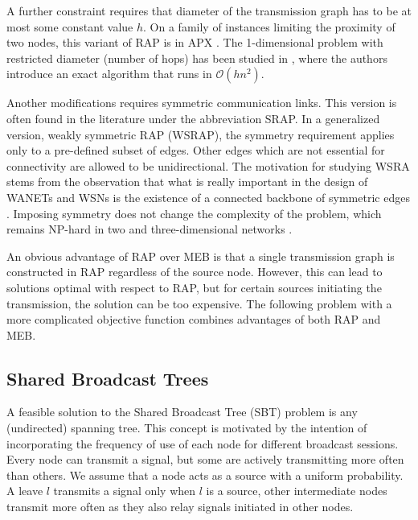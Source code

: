 A further constraint requires that diameter of the transmission graph has to be at most some constant value $h$.
On a family of instances limiting the proximity of two nodes, this variant of RAP is in APX \cite{clementi01b}.
The 1-dimensional problem with restricted diameter (number of hops) has been studied in \cite{clementi03}, where the authors introduce an exact algorithm that runs in $\mathcal{O}(hn^2)$.

Another modifications requires symmetric communication links.
This version is often found in the literature under the abbreviation SRAP.
In a generalized version, weakly symmetric RAP (WSRAP), the symmetry requirement applies only to a pre-defined subset of edges.
Other edges which are not essential for connectivity are allowed to be unidirectional.
The motivation for studying WSRA stems from the observation that what is really important in the design of WANETs and WSNs is the existence of a connected backbone of symmetric edges \cite{santi05}.
Imposing symmetry does not change the complexity of the problem, which remains NP-hard in two and three-dimensional networks \cite{blough02}.

An obvious advantage of RAP over MEB is that a single transmission graph is constructed in RAP regardless of the source node.
However, this can lead to solutions optimal with respect to RAP, but for certain sources initiating the transmission, the solution can be too expensive.
The following problem with a more complicated objective function combines advantages of both RAP and MEB.

\subsection{Shared Broadcast Trees}

A feasible solution to the Shared Broadcast Tree (SBT) problem is any (undirected) spanning tree.
This concept is motivated by the intention of incorporating the frequency of use of each node for different broadcast sessions.
Every node can transmit a signal, but some are actively transmitting more often than others.
We assume that a node acts as a source with a uniform probability. 
A leave $l$ transmits a signal only when $l$ is a source, other intermediate nodes transmit more often as they also relay signals initiated in other nodes.

